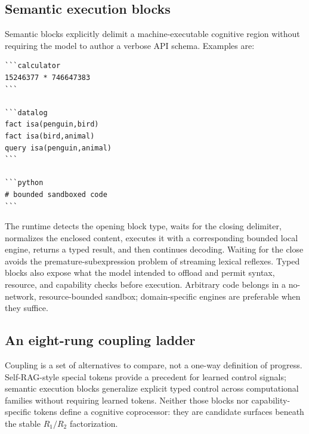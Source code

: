 \documentclass[11pt]{article}
\begin{document}
\subsection{Semantic execution blocks}

Semantic blocks explicitly delimit a machine-executable cognitive region
without requiring the model to author a verbose API schema.  Examples are:

\begin{verbatim}
```calculator
15246377 * 746647383
```

```datalog
fact isa(penguin,bird)
fact isa(bird,animal)
query isa(penguin,animal)
```

```python
# bounded sandboxed code
```
\end{verbatim}

The runtime detects the opening block type, waits for the closing delimiter,
normalizes the enclosed content, executes it with a corresponding bounded local
engine, returns a typed result, and then continues decoding.  Waiting for the
close avoids the premature-subexpression problem of streaming lexical reflexes.
Typed blocks also expose what the model intended to offload and permit syntax,
resource, and capability checks before execution.  Arbitrary code belongs in a
no-network, resource-bounded sandbox; domain-specific engines are preferable
when they suffice.

\subsection{An eight-rung coupling ladder}

Coupling is a set of alternatives to compare, not a one-way definition of
progress.  Self-RAG-style special tokens provide a precedent for learned
control signals; semantic execution blocks generalize explicit typed control
across computational families without requiring learned tokens.
Neither those blocks nor capability-specific tokens define a cognitive
coprocessor: they are candidate surfaces beneath the stable $R_1/R_2$
factorization.
\end{document}
